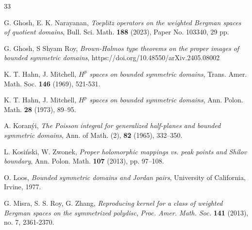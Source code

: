 \documentclass[12pt,reqno]{amsart}
\theoremstyle{remark}
\theoremstyle{definition}
\begin{document}
\begin{thebibliography}{33}


 G. Ghosh, E. K. Narayanan, \emph{Toeplitz operators on the weighted Bergman spaces of quotient domains}, Bull. Sci. Math. {\bf 188} (2023), Paper No. 103340, 29 pp.

 G. Ghosh, S Shyam Roy,  \emph{Brown-Halmos type theorems on the proper images of bounded symmetric domains}, 
https://doi.org/10.48550/arXiv.2405.08002

  K. T. Hahn, J. Mitchell, \emph{$H^p$ spaces on bounded symmetric domains},  Trans. Amer. Math. Soc. {\bf 146} (1969), 521-531. 

  K. T. Hahn, J. Mitchell, \emph{$H^p$ spaces on bounded symmetric domains}, Ann. Polon. Math. {\bf 28} (1973), 89–95.

A. Koran\'yi, \emph{The Poisson integral for generalized half-planes and bounded symmetric domains}, Ann. of Math. (2),   {\bf 82} (1965), 332–350.


 L. Kosi\'nski, W. Zwonek, \emph{Proper holomorphic mappings vs. peak points and Shilov boundary}, Ann. Polon. Math. {\bf 107} (2013), pp. 97–108.

O. Loos, \emph{Bounded symmetric domains and Jordan pairs}, University of California, Irvine, 1977.


 G. Misra, S. S. Roy, G. Zhang, \emph{Reproducing kernel for a class of weighted Bergman spaces on the symmetrized polydisc}, {\it Proc. Amer. Math. Soc.} {\bf 141} (2013), no. 7, 2361-2370.




\end{thebibliography}
\end{document}
